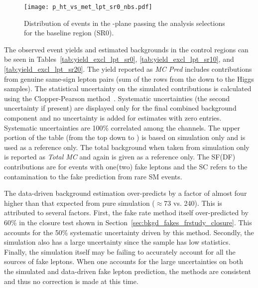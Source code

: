 \begin{figure}[!htb]
\begin{center}
\texttt{[image: p\_ht\_vs\_met\_lpt\_sr0\_nbs.pdf]}
\end{center}
\caption[Distribution of events in the \Ht-\met plane passing the analysis selections for the \lpt baseline region]
{\label{fig:results_lpt_ht_vs_met}
Distribution of events in the \Ht-\met plane passing the analysis selections
for the \lpt baseline region (SR0).
}
\end{figure}

The observed event yields and estimated backgrounds in the \lpt
control regions can be seen in Tables~\ref{tab:yield_excl_lpt_sr0},
\ref{tab:yield_excl_lpt_sr10}, and \ref{tab:yield_excl_lpt_sr20}. The yield
reported as {\it MC Pred} includes contributions from genuine same-sign lepton
pairs (sum of the rows from the \Wgamma down to the Higgs samples). The
statistical uncertainty on the simulated contributions is calculated using the
Clopper-Pearson method~\cite{clopperpearson}. Systematic uncertainties (the second uncertainty if
present) are displayed only for the final combined background component and no
uncertainty is added for estimates with zero entries. Systematic uncertainties
are 100\% correlated among the channels. The upper portion of the table (from
the top down to \ZZ) is based on simulation only and is used as a reference only.
The total background when taken from simulation only is reported as {\it Total
MC} and again is given as a reference only. The SF(DF) contributions are for
events with one(two) fake leptons and the SC refers to the contamination to the
fake prediction from rare SM events.

The data-driven background estimation over-predicts by a factor of almost
four higher than that expected from pure simulation ($\approx 73$ vs.
240). This is attributed to several factors. First, the fake rate
method itself over-predicted by 60\% in the \ttbar closure test shown in
Section~\ref{sec:bkgd_fakes_frstudy_closure}. This accounts for the 50\%
systematic uncertainty driven by this method. Secondly, the simulation also
has a large uncertainty since the \Wj sample has low statistics. Finally,
the simulation itself may be failing to accurately account for all the sources
of fake leptons. When one accounts for the large uncertainties on both the
simulated and data-driven fake lepton prediction, the methods are
consistent and thus no correction is made at this time.

